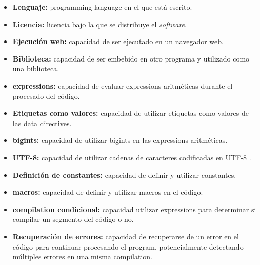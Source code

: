 \begin{itemize}
    \item \textbf{Lenguaje:} \gls{programming language} en el que está escrito.
    \item \textbf{Licencia:} licencia bajo la que se distribuye el
    \textit{software}.
    \item \textbf{Ejecución web:} capacidad de ser ejecutado en un navegador
    web.
    \item \textbf{Biblioteca:} capacidad de ser embebido en otro programa y
    utilizado como una biblioteca.
    \item \textbf{\Glspl{expression}:} capacidad de evaluar \glspl{expression}
    aritméticas durante el procesado del código.
    \item \textbf{Etiquetas como valores:} capacidad de utilizar etiquetas como
    valores de las \glspl{data directive}.
    \item \textbf{\Glspl{bigint}:} capacidad de utilizar \glspl{bigint} en las
    \glspl{expression} aritméticas.
    \item \textbf{UTF-8:} capacidad de utilizar cadenas de caracteres
    codificadas en UTF-8 \parencite{UTF-8}.
    \item \textbf{Definición de constantes:} capacidad de definir y utilizar
    constantes.
    \item \textbf{\Glspl{macro}:} capacidad de definir y utilizar \glspl{macro}
    en el código.
    \item \textbf{\Gls{compilation} condicional:} capacidad utilizar
    \glspl{expression} para determinar si compilar un segmento del código o no.
    \item \textbf{Recuperación de errores:} capacidad de recuperarse de un error
    en el código para continuar procesando el \gls{program}, potencialmente
    detectando múltiples errores en una misma \gls{compilation}.
\end{itemize}


